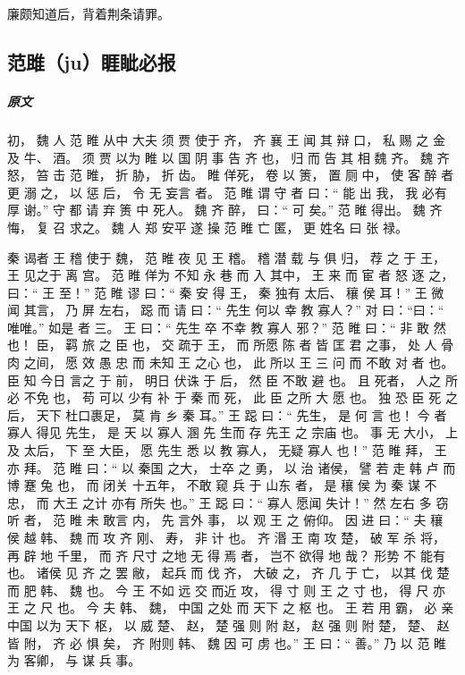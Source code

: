 \documentclass[UTF8,a4paper,8pt]{ctexbook}
\begin{document}
				廉颇知道后，背着荆条请罪。
		
		
		\subsection{范雎（ju）睚眦必报}
			\subparagraph{原文}初， 魏 人 范 睢 从中 大夫 须 贾 使于 齐， 齐 襄 王 闻 其 辩 口， 私 赐 之 金 及 牛、 酒。 须 贾 以为 睢 以 国 阴 事 告 齐 也， 归 而 告 其 相 魏 齐。 魏 齐 怒， 笞 击 范 睢， 折 胁， 折 齿。 睢 佯死， 卷 以 箦， 置 厕 中， 使 客 醉 者 更 溺 之， 以 惩 后， 令 无 妄言 者。 范 睢 谓 守 者 曰：“ 能 出 我， 我 必有 厚 谢。” 守 都 请 弃 箦 中 死人。 魏 齐 醉， 曰：“ 可 矣。” 范 睢 得出。 魏 齐 悔， 复 召 求之。 魏 人 郑 安平 遂 操 范 睢 亡 匿， 更 姓名 曰 张 禄。 
			
			秦 谒者 王 稽 使于 魏， 范 睢 夜 见 王 稽。 稽 潜 载 与 俱 归， 荐 之 于 王， 王 见之于 离 宫。 范 睢 佯为 不知 永 巷 而 入 其中， 王 来 而 宦 者 怒 逐 之， 曰：“ 王 至！” 范 睢 谬 曰：“ 秦 安 得 王， 秦 独有 太后、 穰 侯 耳！” 王 微 闻 其言， 乃 屏 左右， 跽 而 请 曰：“ 先生 何以 幸 教 寡人？” 对 曰：“曰：“ 唯唯。” 如是 者 三。 王 曰：“ 先生 卒 不幸 教 寡人 邪？” 范 睢 曰：“ 非 敢 然也！ 臣， 羁 旅 之 臣 也， 交 疏于 王， 而 所愿 陈 者 皆 匡 君 之事， 处 人 骨肉 之间， 愿 效 愚 忠 而 未知 王 之心 也， 此 所以 王 三 问 而 不敢 对 者 也。 臣 知 今日 言之 于 前， 明日 伏诛 于 后， 然 臣 不敢 避 也。 且 死者， 人之 所 必 不免 也， 苟 可以 少有 补 于 秦 而 死， 此 臣 之所 大 愿 也。 独 恐 臣 死 之后， 天下 杜口裹足， 莫 肯 乡 秦 耳。” 王 跽 曰：“ 先生， 是 何 言 也！ 今 者 寡人 得见 先生， 是 天 以 寡人 溷 先 生而 存 先王 之 宗庙 也。 事 无 大小， 上 及 太后， 下 至 大臣， 愿 先生 悉 以 教 寡人， 无疑 寡人 也！” 范 睢 拜， 王 亦 拜。 范 睢 曰：“ 以 秦国 之大， 士卒 之 勇， 以 治 诸侯， 譬 若 走 韩 卢 而 博 蹇 兔 也， 而 闭关 十五年， 不敢 窥 兵 于 山东 者， 是 穰 侯 为 秦 谋 不忠， 而 大王 之计 亦有 所失 也。” 王 跽 曰：“ 寡人 愿闻 失计！” 然 左右 多 窃听 者， 范 睢 未 敢言 内， 先 言外 事， 以 观 王 之 俯仰。 因 进 曰：“ 夫 穰 侯 越 韩、 魏 而 攻 齐 刚、 寿， 非 计 也。 齐 湣 王 南 攻 楚， 破 军 杀 将， 再 辟 地 千里， 而 齐 尺寸 之地 无 得 焉 者， 岂不 欲得 地 哉？ 形势 不 能有 也。 诸侯 见 齐 之 罢 敝， 起兵 而 伐 齐， 大破 之， 齐 几 于 亡， 以其 伐 楚 而 肥 韩、 魏 也。 今 王 不如 远 交 而近 攻， 得 寸 则 王 之 寸 也， 得 尺 亦 王 之 尺 也。 今 夫 韩、 魏， 中国 之处 而 天下 之 枢 也。 王 若 用 霸， 必 亲 中国 以为 天下 枢， 以 威 楚、 赵， 楚 强 则 附 赵， 赵 强 则 附 楚， 楚、 赵 皆 附， 齐 必 惧 矣， 齐 附则 韩、 魏 因 可 虏 也。” 王 曰：“ 善。” 乃 以 范 睢 为 客卿， 与 谋 兵 事。 
			
\end{document}
